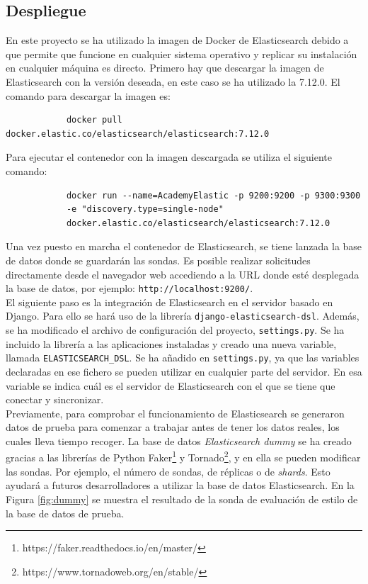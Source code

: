 \subsection{Despliegue}
En este proyecto se ha utilizado la imagen de Docker de Elasticsearch debido a que permite que funcione en cualquier sistema operativo y replicar su instalación en cualquier máquina es directo. Primero hay que descargar la imagen de Elasticsearch con la versión deseada, en este caso se ha utilizado la 7.12.0. El comando para descargar la imagen es:
{\footnotesize
		\begin{verbatim}
			docker pull docker.elastic.co/elasticsearch/elasticsearch:7.12.0
		\end{verbatim}
		}
  \newpage
Para ejecutar el contenedor con la imagen descargada se utiliza el siguiente comando:

{\footnotesize
		\begin{verbatim}
			docker run --name=AcademyElastic -p 9200:9200 -p 9300:9300
            -e "discovery.type=single-node" 
            docker.elastic.co/elasticsearch/elasticsearch:7.12.0
		\end{verbatim}
		}

  Una vez puesto en marcha el contenedor de Elasticsearch, se tiene lanzada la base de datos donde se guardarán las sondas. Es posible realizar solicitudes directamente desde el navegador web accediendo a la URL donde esté desplegada la base de datos, por ejemplo: \texttt{http://localhost:9200/}.\\
  
   El siguiente paso es la integración de Elasticsearch en el servidor basado en Django. Para ello se hará uso de la librería \texttt{django-elasticsearch-dsl}. Además, se ha modificado el archivo de configuración del proyecto, \texttt{settings.py}. Se ha incluido la librería a las aplicaciones instaladas y creado una nueva variable, llamada \texttt{ELASTICSEARCH\_DSL}. Se ha añadido en \texttt{settings.py}, ya que las variables declaradas en ese fichero se pueden utilizar en cualquier parte del servidor. En esa variable se indica cuál es el servidor de Elasticsearch con el que se tiene que conectar y sincronizar.\\

Previamente, para comprobar el funcionamiento de Elasticsearch se generaron datos de prueba para comenzar a trabajar antes de tener los datos reales, los cuales lleva tiempo recoger. La base de datos \textit{Elasticsearch dummy} se ha creado gracias a las librerías de Python Faker\footnote{https://faker.readthedocs.io/en/master/} y Tornado\footnote{https://www.tornadoweb.org/en/stable/}, y en ella se pueden modificar las sondas. Por ejemplo, el número de sondas, de réplicas o de \textit{shards}. Esto ayudará a futuros desarrolladores a utilizar la base de datos Elasticsearch. En la Figura \ref{fig:dummy} se muestra el resultado de la sonda de evaluación de estilo de la base de datos de prueba.



